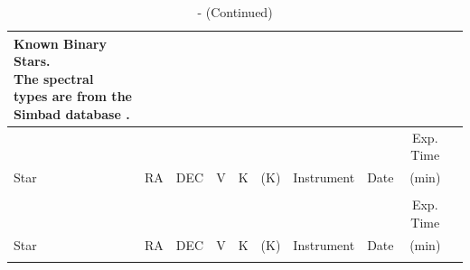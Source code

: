\begin{scriptsize}
\begin{longtable}{lcccccrccc}
    
    \caption{Known Binary Stars.\\
             The spectral types are from the Simbad database \citep{Simbad}. \label{paper5_tab:known}} 
     \\ \hline
     & & & & & & & & Exp. Time \\
     Star & RA & DEC & V & K & (K) & Instrument  & Date  & (min) \\ \hline
    \endfirsthead

    \caption{ - (Continued)}
    \\ \hline
    & & & & & & & & Exp. Time \\
     Star & RA & DEC & V & K & (K) & Instrument  & Date  & (min) \\ \hline
    \endhead

    \hline
    \endfoot

    \hline
    \endlastfoot


\end{longtable}
\end{scriptsize}
